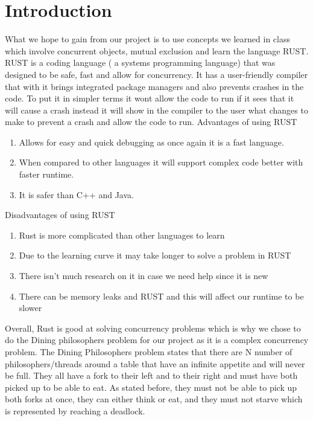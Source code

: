 \documentclass[conference]{IEEEtran}
\begin{document}
	\section{Introduction}
	 What we hope to gain from our project is to use concepts we learned in class which involve concurrent objects, mutual exclusion and learn the language RUST. RUST is a coding language ( a systems programming language) that was designed to be safe, fast and allow for concurrency.  It has a user-friendly compiler that with it brings integrated package managers and also prevents crashes in the code. To put it in simpler terms it wont allow the code to run if it sees that it will cause a crash instead it will show in the compiler to the user what changes to make to prevent a crash and allow the code to run. 
	 \linebreak
	 Advantages of using RUST
	 \begin{enumerate}
	 	\item Allows for easy and quick debugging as once again it is a fast language.
	 	\item When compared to other languages it will support complex code better with faster runtime.
	 	\item It is safer than C++ and Java.
	 \end{enumerate}
	 Disadvantages of using RUST
	 \begin{enumerate}
	 	\item Rust is more complicated than other languages to learn
	 	\item Due to the learning curve it may take longer to solve a problem in RUST
	 	\item There isn’t much research on it in case we need help since it is new
	 	\item There can be memory leaks and RUST and this will affect our runtime to be slower
	\end{enumerate}
	Overall, Rust is good at solving concurrency problems which is why we chose to do the Dining philosophers problem for our project as it is a complex concurrency problem. The Dining Philosophers problem states that there are N number of philosophers/threads around a table that have an infinite appetite and will never be full. They all have a fork to their left and to their right and must have both picked up to be able to eat. As stated before, they must not be able to pick up both forks at once, they can either think or eat, and they must not starve which is represented by reaching a deadlock.
	 \linebreak
\end{document}
